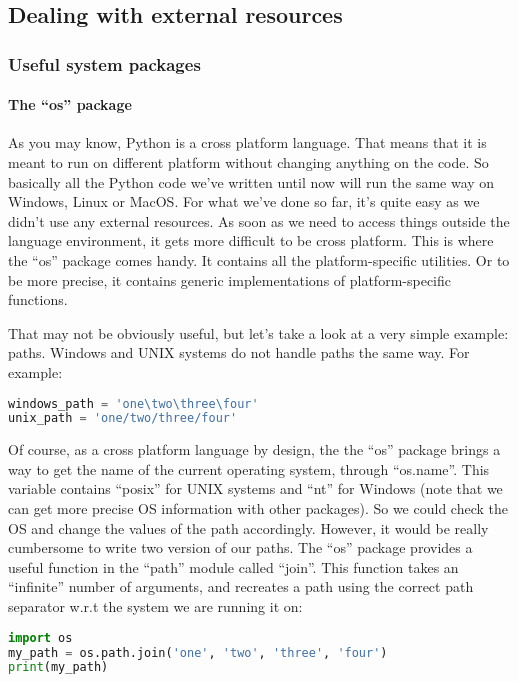 \subsection{Dealing with external resources}
\subsubsection{Useful system packages}

\paragraph{The ``os'' package}
As you may know, Python is a cross platform language. That means that it
is meant to run on different platform without changing anything on the code.
So basically all the Python code we've written until now will run the same way
on Windows, Linux or MacOS. For what we've done so far, it's quite easy as we
didn't use any external resources. As soon as we need to access things outside
the language environment, it gets more difficult to be cross platform. This is
where the ``os'' package comes handy. It contains all the platform-specific utilities.
Or to be more precise, it contains generic implementations of platform-specific
functions.

\vspace{5mm}

That may not be obviously useful, but let's take a look at a very simple example:
paths. Windows and UNIX systems do not handle paths the same way. For example:

\begin{lstlisting}[language=python]
windows_path = 'one\two\three\four'
unix_path = 'one/two/three/four'
\end{lstlisting}

Of course, as a cross platform language by design, the the ``os'' package brings
a way to get the name of the current operating system, through ``os.name''. This
variable contains ``posix'' for UNIX systems and ``nt'' for Windows (note that
we can get more precise OS information with other packages). So we could check the OS
and change the values of the path accordingly. However, it would be really
cumbersome to write two version of our paths. The ``os'' package
provides a useful function in the ``path'' module called ``join''. This function
takes an ``infinite'' number of arguments, and recreates a path using the correct
path separator w.r.t the system we are running it on:

\begin{lstlisting}[language=python]
import os
my_path = os.path.join('one', 'two', 'three', 'four')
print(my_path)
\end{lstlisting}

